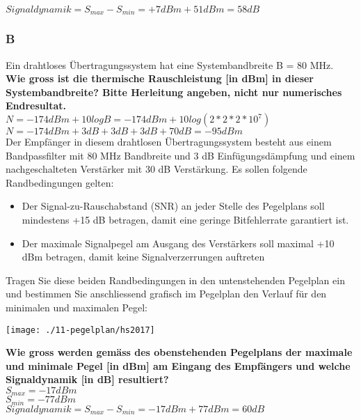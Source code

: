 $Signaldynamik = S_{max}-S_{min}=+7dBm+51dBm=58dB$

\columnbreak

\subsubsection{B}
Ein drahtloses Übertragungssystem hat eine Systembandbreite B = 80 MHz.\\

\textbf{Wie gross ist die thermische Rauschleistung [in dBm] in dieser Systembandbreite? Bitte Herleitung angeben, nicht nur numerisches Endresultat.}\\
$N=-174dBm+10logB=-174dBm+10log(2*2*2*10^7)$\\
$N=-174dBm + 3 dB + 3 dB + 3 dB + 70 dB = -95dBm$\\

Der Empfänger in diesem drahtlosen Übertragungssystem besteht aus einem Bandpassfilter mit 80 MHz Bandbreite und 3 dB Einfügungsdämpfung und einem nachgeschalteten
Verstärker mit 30 dB Verstärkung. Es sollen folgende Randbedingungen gelten:\\
\begin{itemize}
    \item Der Signal-zu-Rauschabstand (SNR) an jeder Stelle des Pegelplans soll mindestens +15 dB betragen, damit eine geringe Bitfehlerrate garantiert ist.
    \item Der maximale Signalpegel am Ausgang des Verstärkers soll maximal +10 dBm betragen, damit keine Signalverzerrungen auftreten\\
\end{itemize}

Tragen Sie diese beiden Randbedingungen in den untenstehenden Pegelplan ein und bestimmen Sie anschliessend grafisch im Pegelplan den Verlauf für den minimalen und
maximalen Pegel:
\begin{center}
    \vspace{-8pt}
    \texttt{[image: ./11-pegelplan/hs2017]}
    \vspace{-8pt}
\end{center}

\textbf{Wie gross werden gemäss des obenstehenden Pegelplans der maximale und minimale Pegel [in dBm] am Eingang des Empfängers und welche Signaldynamik [in dB] resultiert?}\\
$S_{max}=-17dBm$\\
$S_{min}=-77dBm$\\

$Signaldynamik = S_{max}-S_{min}=-17dBm+77dBm=60dB$
